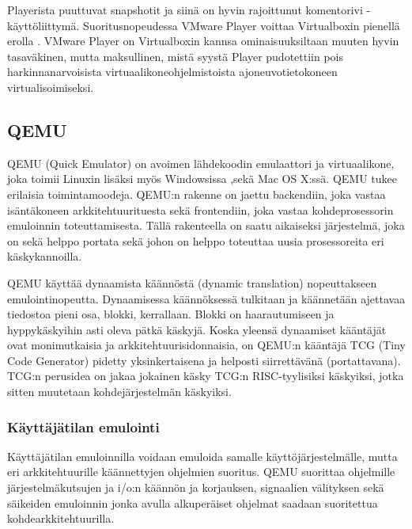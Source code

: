 Playerista puuttuvat snapshotit ja siinä on hyvin rajoittunut komentorivi -käyttöliittymä. Suoritusnopeudessa VMware Player voittaa Virtualboxin pienellä erolla \cite{vplayervsvbox}. VMware Player on Virtualboxin kannsa ominaisuuksiltaan muuten hyvin tasaväkinen, mutta maksullinen, mistä syystä Player pudotettiin pois harkinnanarvoisista virtuaalikoneohjelmistoista ajoneuvotietokoneen virtualisoimiseksi.


\subsection{QEMU}
QEMU (Quick Emulator) on avoimen lähdekoodin emulaattori ja virtuaalikone, joka toimii Linuxin lisäksi myös Windowsissa ,sekä Mac OS X:ssä. QEMU tukee erilaisia toimintamoodeja. QEMU:n rakenne on jaettu backendiin, joka vastaa isäntäkoneen arkkitehtuurituesta sekä frontendiin, joka vastaa kohdeprosessorin emuloinnin toteuttamisesta. Tällä rakenteella on saatu aikaiseksi järjestelmä, joka on sekä helppo portata sekä johon on helppo toteuttaa uusia prosessoreita eri käskykannoilla. \cite{qemu_doc}

QEMU käyttää dynaamista käännöstä (dynamic translation) nopeuttakseen emulointinopeutta. Dynaamisessa käännöksessä tulkitaan ja käännetään ajettavaa tiedostoa pieni osa, blokki, kerrallaan. Blokki on haarautumiseen ja hyppykäskyihin asti oleva pätkä käskyjä. Koska yleensä dynaamiset kääntäjät ovat monimutkaisia ja arkkitehtuurisidonnaisia, on QEMU:n kääntäjä TCG (Tiny Code Generator) pidetty yksinkertaisena ja helposti siirrettävänä (portattavana). TCG:n perusidea on jakaa jokainen käsky TCG:n RISC-tyylisiksi käskyiksi, jotka sitten muutetaan kohdejärjestelmän käskyiksi. \cite{qemu_tech}


\subsubsection{Käyttäjätilan emulointi}
Käyttäjätilan emuloinnilla voidaan emuloida samalle käyttöjärjestelmälle, mutta eri arkkitehtuurille käännettyjen ohjelmien suoritus. QEMU suorittaa ohjelmille järjestelmäkutsujen ja i/o:n käännön ja korjauksen, signaalien välityksen sekä säikeiden emuloinnin jonka avulla alkuperäiset ohjelmat saadaan suoritettua kohdearkkitehtuurilla. \cite{qemu_tech}


